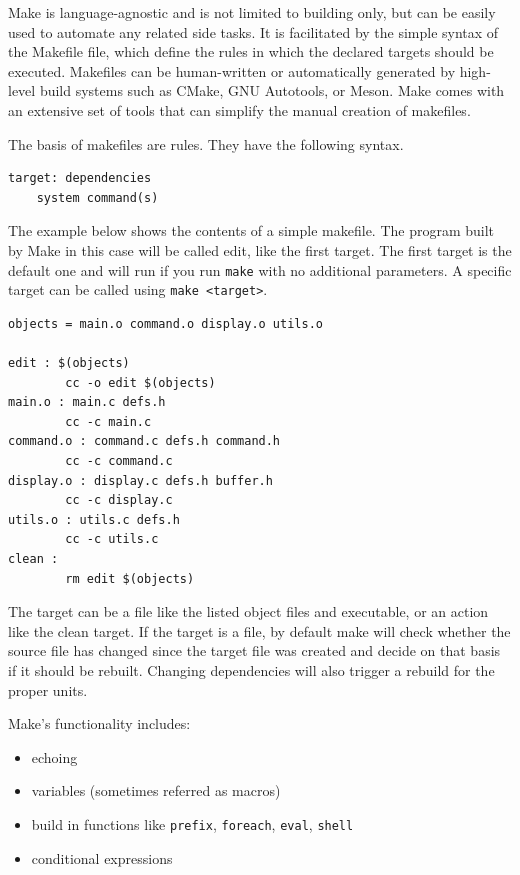 Make is language-agnostic and is not limited to building only, but can
be easily used to automate any related side tasks. It is facilitated by
the simple syntax of the Makefile file, which define the rules in which
the declared targets should be executed. Makefiles can be human-written
or automatically generated by high-level build systems such as CMake,
GNU Autotools, or Meson. Make comes with an extensive set of tools that
can simplify the manual creation of makefiles.

The basis of makefiles are rules. They have the following syntax.

\begin{verbatim}
target: dependencies
    system command(s)
\end{verbatim}

The example below shows the contents of a simple makefile. The program
built by Make in this case will be called edit, like the first target.
The first target is the default one and will run if you run
\texttt{make} with no additional parameters. A specific target can be
called using \texttt{make\ \textless{}target\textgreater{}}.

\begin{verbatim}
objects = main.o command.o display.o utils.o

edit : $(objects)
        cc -o edit $(objects)
main.o : main.c defs.h
        cc -c main.c
command.o : command.c defs.h command.h
        cc -c command.c
display.o : display.c defs.h buffer.h
        cc -c display.c
utils.o : utils.c defs.h
        cc -c utils.c
clean :
        rm edit $(objects)
\end{verbatim}

The target can be a file like the listed object files and executable, or
an action like the clean target. If the target is a file, by default
make will check whether the source file has changed since the target
file was created and decide on that basis if it should be rebuilt.
Changing dependencies will also trigger a rebuild for the proper units.

Make's functionality includes:

\begin{itemize}
\tightlist
\item
  echoing
\item
  variables (sometimes referred as macros)
\item
  build in functions like \texttt{prefix}, \texttt{foreach},
  \texttt{eval}, \texttt{shell}
\item
  conditional expressions
\end{itemize}

